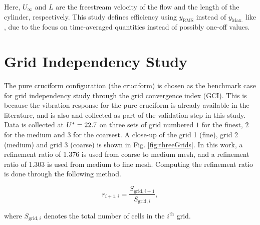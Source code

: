 \documentclass[oneside]{utmthesis}
\begin{document}
\noindent Here, $U_{\infty}$ and $L$ are the freestream velocity of the flow and the length of the cylinder, respectively. This study defines efficiency using $y_{\text{RMS}}$ instead of $y_{\text{Max.}}$ like \citet{Sun2018}, due to the focus on time-averaged quantities instead of possibly one-off values.

\section{Grid Independency Study} \label{sec:gridIndStu}

\vspace{\baselineskip}

The pure cruciform configuration (the \angfi{} cruciform) is chosen as the benchmark case for grid independency study through the grid convergence index (GCI). This is because the vibration response for the pure cruciform is already available in the literature, and is also and collected as part of the validation step in this study. Data is collected at $U^{*} = 22.7$ on three sets of grid numbered $1$ for the finest, $2$ for the medium and $3$ for the coarsest. A close-up of the grid 1 (fine), grid 2 (medium) and grid 3 (coarse) is shown in Fig. \ref{fig:threeGrids}. In this work, a refinement ratio of 1.376 is used from coarse to medium mesh, and a refinement ratio of 1.303 is used from medium to fine mesh. Computing the refinement ratio is done through the following method.

\begin{equation}
  r_{i+1,i} = \frac{S_{\text{grid},i+1}}{S_{\text{grid},i}},
  \label{eq:refinementRatio}
\end{equation}

\noindent where $S_{\text{grid},i}$ denotes the total number of cells in the $i^{\text{th}}$ grid.
\end{document}
